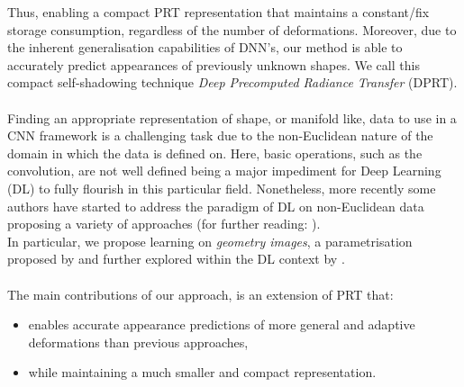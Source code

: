 Thus, enabling a compact PRT representation that maintains a constant/fix storage consumption, regardless of the number of deformations. Moreover, due to the inherent generalisation capabilities of DNN's, our method is able to accurately predict appearances of previously unknown shapes. We call this compact self-shadowing technique \textit{Deep Precomputed Radiance Transfer} (DPRT). \\
\\
Finding an appropriate representation of shape, or manifold like, data to use in a CNN framework is a challenging task due to the non-Euclidean nature of the domain in which the data is defined on. Here, basic operations, such as the convolution, are not well defined being a major impediment for Deep Learning (DL) to fully flourish in this particular field. Nonetheless, more recently some authors have started to address the paradigm of DL on non-Euclidean data proposing a variety of approaches \cite{Masci2015ShapeNetCN, Geometric_deep_learning, CNN_on_Torus} (for further reading: \cite{GeoDeepLearning}). \\
In particular, we propose learning on \textit{geometry images}, a parametrisation proposed by \citep{gu2002geometry} and further explored within the DL context by \cite{Sinha2016DeepL3}.   
\\
\\
The main contributions of our approach, is an extension of PRT that: 
\begin{itemize}
\item enables accurate appearance predictions of more general and adaptive deformations than previous approaches,
\item while maintaining a much smaller and compact representation. 
\end{itemize}
